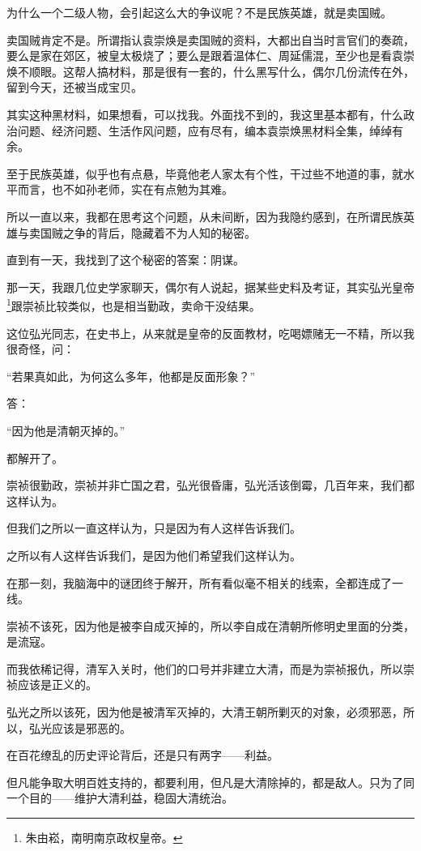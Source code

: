\begin{multicols}{\theparacolNo}
为什么一个二级人物，会引起这么大的争议呢？不是民族英雄，就是卖国贼。

卖国贼肯定不是。所谓指认袁崇焕是卖国贼的资料，大都出自当时言官们的奏疏，要么是家在郊区，被皇太极烧了；要么是跟着温体仁、周延儒混，至少也是看袁崇焕不顺眼。这帮人搞材料，那是很有一套的，什么黑写什么，偶尔几份流传在外，留到今天，还被当成宝贝。

其实这种黑材料，如果想看，可以找我。外面找不到的，我这里基本都有，什么政治问题、经济问题、生活作风问题，应有尽有，编本袁崇焕黑材料全集，绰绰有余。

至于民族英雄，似乎也有点悬，毕竟他老人家太有个性，干过些不地道的事，就水平而言，也不如孙老师，实在有点勉为其难。

所以一直以来，我都在思考这个问题，从未间断，因为我隐约感到，在所谓民族英雄与卖国贼之争的背后，隐藏着不为人知的秘密。

直到有一天，我找到了这个秘密的答案：阴谋。

那一天，我跟几位史学家聊天，偶尔有人说起，据某些史料及考证，其实弘光皇帝\footnote{朱由崧，南明南京政权皇帝。}跟崇祯比较类似，也是相当勤政，卖命干没结果。

这位弘光同志，在史书上，从来就是皇帝的反面教材，吃喝嫖赌无一不精，所以我很奇怪，问：

“若果真如此，为何这么多年，他都是反面形象？”

答：

“因为他是清朝灭掉的。”

都解开了。

崇祯很勤政，崇祯并非亡国之君，弘光很昏庸，弘光活该倒霉，几百年来，我们都这样认为。

但我们之所以一直这样认为，只是因为有人这样告诉我们。

之所以有人这样告诉我们，是因为他们希望我们这样认为。

在那一刻，我脑海中的谜团终于解开，所有看似毫不相关的线索，全都连成了一线。

崇祯不该死，因为他是被李自成灭掉的，所以李自成在清朝所修明史里面的分类，是流寇。

而我依稀记得，清军入关时，他们的口号并非建立大清，而是为崇祯报仇，所以崇祯应该是正义的。

弘光之所以该死，因为他是被清军灭掉的，大清王朝所剿灭的对象，必须邪恶，所以，弘光应该是邪恶的。

在百花缭乱的历史评论背后，还是只有两字——利益。

但凡能争取大明百姓支持的，都要利用，但凡是大清除掉的，都是敌人。只为了同一个目的——维护大清利益，稳固大清统治。


\end{multicols}
